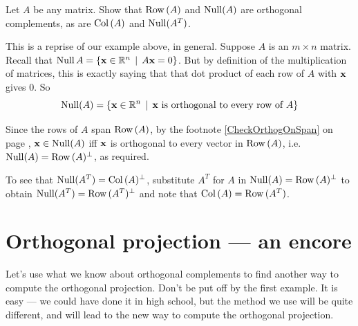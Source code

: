 \begin{myprob}
Let $A$ be any matrix.  Show that $\operatorname{Row\,}(A)$ and $\operatorname{Null}(A)$ are orthogonal complements, as are  $\operatorname{Col\,}(A)$ and $\operatorname{Null}(A^T)$.  

\medskip

\begin{mysol}

This is a reprise of our example above, in general.
Suppose $A$ is an $m \times n$ matrix.
Recall that $\operatorname{Null} A=\{\mathbf{x} \in \mathbb{R}^n\,\mid \, A \mathbf{x}=0 \}$.
But by definition of the multiplication of matrices, this is
exactly saying that that dot product of each row of $A$ with $\mathbf{x}$
gives 0.  So $$\operatorname{Null}(A)=\{\mathbf{x} \in \mathbb{R}^n \,\mid \, \mathbf{x} \text{ is orthogonal to every row of }A \}$$ 

Since the rows of $A$ span $\operatorname{Row\,}(A)$, by the footnote \ref{CheckOrthogOnSpan} on page \pageref{CheckOrthogOnSpan},  $\mathbf{x} \in \operatorname{Null}(A)$ iff $\mathbf{x}$   is orthogonal to every  vector in $\operatorname{Row\,}(A)$, i.e. $\operatorname{Null}(A)=\operatorname{Row\,}(A)^\perp$, as required.

To see that $\operatorname{Null}(A^T)=\operatorname{Col\,}(A)^\perp$, substitute $A^T$ for $A$ in   $\operatorname{Null}(A)=\operatorname{Row\,}(A)^\perp$ to obtain $\operatorname{Null}(A^T)=\operatorname{Row\,}(A^T)^\perp$ and note that $\operatorname{Col\,}(A)=\operatorname{Row\,}(A^T)$.
\end{mysol}
\end{myprob}





 


\section{Orthogonal projection --- an encore}

Let's use what we know about orthogonal complements to find another way to compute the orthogonal projection. Don't be put off by the first example. It is easy --- we could have done it in high school, but the method we use will be quite different, and will lead to the new way to compute the orthogonal projection.

